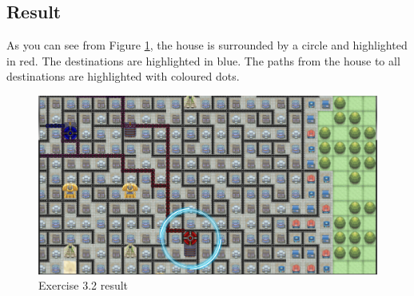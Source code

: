 \subsection*{Result}
As you can see from Figure \ref{img:Ex3-2}, the house is surrounded by a circle and highlighted in red. The destinations are highlighted in blue. The paths from the house to all destinations are highlighted with coloured dots.

\begin{figure}
\centering
\includegraphics[scale=0.2]{img/exercise4}
\caption{Exercise 3.2 result}
\label{img:Ex3-2}
\end{figure}